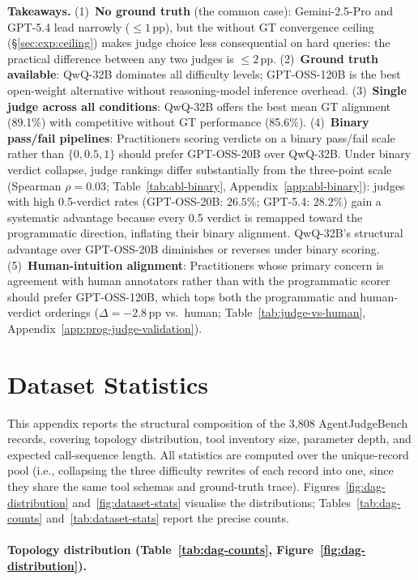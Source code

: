 \textbf{Takeaways.} (1)~\textbf{No ground truth} (the common case): Gemini-2.5-Pro and GPT-5.4 lead narrowly ($\leq 1$\,pp), but the without GT convergence ceiling (\S\ref{sec:exp:ceiling}) makes judge choice less consequential on hard queries: the practical difference between any two judges is $\leq 2$\,pp. (2)~\textbf{Ground truth available}: QwQ-32B dominates all difficulty levels; GPT-OSS-120B is the best open-weight alternative without reasoning-model inference overhead. (3)~\textbf{Single judge across all conditions}: QwQ-32B offers the best mean GT alignment (89.1\%) with competitive without GT performance (85.6\%). (4)~\textbf{Binary pass/fail pipelines}: Practitioners scoring verdicts on a binary pass/fail scale rather than $\{0, 0.5, 1\}$ should prefer GPT-OSS-20B over QwQ-32B. Under binary verdict collapse, judge rankings differ substantially from the three-point scale (Spearman $\rho = 0.03$; Table~\ref{tab:abl-binary}, Appendix~\ref{app:abl-binary}): judges with high 0.5-verdict rates (GPT-OSS-20B: $26.5\%$; GPT-5.4: $28.2\%$) gain a systematic advantage because every 0.5 verdict is remapped toward the programmatic direction, inflating their binary alignment. QwQ-32B's structural advantage over GPT-OSS-20B diminishes or reverses under binary scoring. (5)~\textbf{Human-intuition alignment}: Practitioners whose primary concern is agreement with human annotators rather than with the programmatic scorer should prefer GPT-OSS-120B, which tops both the programmatic and human-verdict orderings ($\Delta = -2.8$\,pp vs.\ human; Table~\ref{tab:judge-vs-human}, Appendix~\ref{app:prog-judge-validation}).

\section{Dataset Statistics}
\label{app:dataset-stats}

This appendix reports the structural composition of the 3,808 AgentJudgeBench records, covering topology distribution, tool inventory size, parameter depth, and expected call-sequence length. All statistics are computed over the unique-record pool (i.e., collapsing the three difficulty rewrites of each record into one, since they share the same tool schemas and ground-truth trace). Figures~\ref{fig:dag-distribution} and~\ref{fig:dataset-stats} visualise the distributions; Tables~\ref{tab:dag-counts} and~\ref{tab:dataset-stats} report the precise counts.

\paragraph{Topology distribution (Table~\ref{tab:dag-counts}, Figure~\ref{fig:dag-distribution}).}

